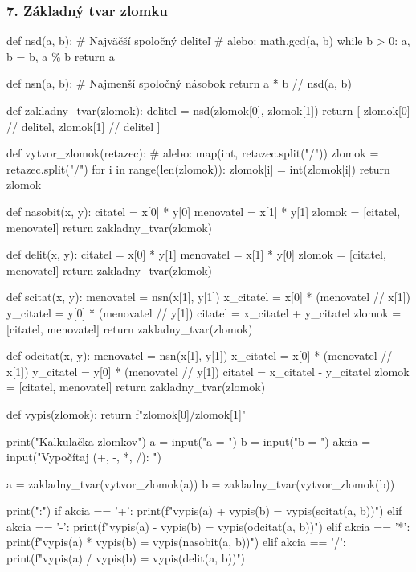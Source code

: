 \subsubsection*{7. Základný tvar zlomku}
\begin{solution}
def nsd(a, b):
    # Najväčší spoločný deliteľ
    # alebo: math.gcd(a, b)
    while b > 0:
        a, b = b, a \% b
    return a

def nsn(a, b):
    # Najmenší spoločný násobok
    return a * b // nsd(a, b)

def zakladny_tvar(zlomok):
    delitel = nsd(zlomok[0], zlomok[1])
    return [
        zlomok[0] // delitel,
        zlomok[1] // delitel
    ]

def vytvor_zlomok(retazec):
    # alebo: map(int, retazec.split("/"))
    zlomok = retazec.split("/")
    for i in range(len(zlomok)):
        zlomok[i] = int(zlomok[i])
    return zlomok

def nasobit(x, y):
    citatel = x[0] * y[0]
    menovatel = x[1] * y[1]
    zlomok = [citatel, menovatel]
    return zakladny_tvar(zlomok)

def delit(x, y):
    citatel = x[0] * y[1]
    menovatel = x[1] * y[0]
    zlomok = [citatel, menovatel]
    return zakladny_tvar(zlomok)

def scitat(x, y):
    menovatel = nsn(x[1], y[1])
    x_citatel = x[0] * (menovatel // x[1])
    y_citatel = y[0] * (menovatel // y[1])
    citatel = x_citatel + y_citatel
    zlomok = [citatel, menovatel]
    return zakladny_tvar(zlomok)

def odcitat(x, y):
    menovatel = nsn(x[1], y[1])
    x_citatel = x[0] * (menovatel // x[1])
    y_citatel = y[0] * (menovatel // y[1])
    citatel = x_citatel - y_citatel
    zlomok = [citatel, menovatel]
    return zakladny_tvar(zlomok)

def vypis(zlomok):
    return f"{zlomok[0]}/{zlomok[1]}"


print("Kalkulačka zlomkov")
a = input("a = ")
b = input("b = ")
akcia = input("Vypočítaj (+, -, *, /): ")

a = zakladny_tvar(vytvor_zlomok(a))
b = zakladny_tvar(vytvor_zlomok(b))

print(":")
if akcia == '+':
    print(f"{vypis(a)} + {vypis(b)} = {vypis(scitat(a, b))}")
elif akcia == '-':
    print(f"{vypis(a)} - {vypis(b)} = {vypis(odcitat(a, b))}")
elif akcia == '*':
    print(f"{vypis(a)} * {vypis(b)} = {vypis(nasobit(a, b))}")
elif akcia == '/':
    print(f"{vypis(a)} / {vypis(b)} = {vypis(delit(a, b))}")
\end{solution}
